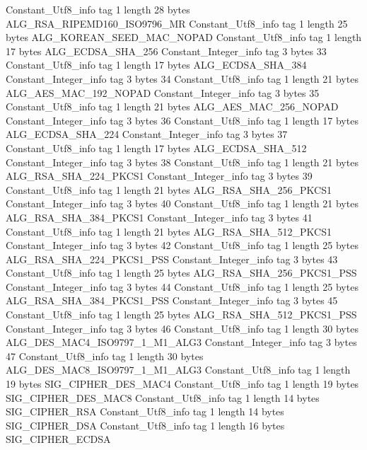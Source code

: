 {{{		}
		Constant_Utf8_info {
			tag	1
			length	28
			bytes	ALG_RSA_RIPEMD160_ISO9796_MR
		}
		Constant_Utf8_info {
			tag	1
			length	25
			bytes	ALG_KOREAN_SEED_MAC_NOPAD
		}
		Constant_Utf8_info {
			tag	1
			length	17
			bytes	ALG_ECDSA_SHA_256
		}
		Constant_Integer_info {
			tag	3
			bytes	33
		}
		Constant_Utf8_info {
			tag	1
			length	17
			bytes	ALG_ECDSA_SHA_384
		}
		Constant_Integer_info {
			tag	3
			bytes	34
		}
		Constant_Utf8_info {
			tag	1
			length	21
			bytes	ALG_AES_MAC_192_NOPAD
		}
		Constant_Integer_info {
			tag	3
			bytes	35
		}
		Constant_Utf8_info {
			tag	1
			length	21
			bytes	ALG_AES_MAC_256_NOPAD
		}
		Constant_Integer_info {
			tag	3
			bytes	36
		}
		Constant_Utf8_info {
			tag	1
			length	17
			bytes	ALG_ECDSA_SHA_224
		}
		Constant_Integer_info {
			tag	3
			bytes	37
		}
		Constant_Utf8_info {
			tag	1
			length	17
			bytes	ALG_ECDSA_SHA_512
		}
		Constant_Integer_info {
			tag	3
			bytes	38
		}
		Constant_Utf8_info {
			tag	1
			length	21
			bytes	ALG_RSA_SHA_224_PKCS1
		}
		Constant_Integer_info {
			tag	3
			bytes	39
		}
		Constant_Utf8_info {
			tag	1
			length	21
			bytes	ALG_RSA_SHA_256_PKCS1
		}
		Constant_Integer_info {
			tag	3
			bytes	40
		}
		Constant_Utf8_info {
			tag	1
			length	21
			bytes	ALG_RSA_SHA_384_PKCS1
		}
		Constant_Integer_info {
			tag	3
			bytes	41
		}
		Constant_Utf8_info {
			tag	1
			length	21
			bytes	ALG_RSA_SHA_512_PKCS1
		}
		Constant_Integer_info {
			tag	3
			bytes	42
		}
		Constant_Utf8_info {
			tag	1
			length	25
			bytes	ALG_RSA_SHA_224_PKCS1_PSS
		}
		Constant_Integer_info {
			tag	3
			bytes	43
		}
		Constant_Utf8_info {
			tag	1
			length	25
			bytes	ALG_RSA_SHA_256_PKCS1_PSS
		}
		Constant_Integer_info {
			tag	3
			bytes	44
		}
		Constant_Utf8_info {
			tag	1
			length	25
			bytes	ALG_RSA_SHA_384_PKCS1_PSS
		}
		Constant_Integer_info {
			tag	3
			bytes	45
		}
		Constant_Utf8_info {
			tag	1
			length	25
			bytes	ALG_RSA_SHA_512_PKCS1_PSS
		}
		Constant_Integer_info {
			tag	3
			bytes	46
		}
		Constant_Utf8_info {
			tag	1
			length	30
			bytes	ALG_DES_MAC4_ISO9797_1_M1_ALG3
		}
		Constant_Integer_info {
			tag	3
			bytes	47
		}
		Constant_Utf8_info {
			tag	1
			length	30
			bytes	ALG_DES_MAC8_ISO9797_1_M1_ALG3
		}
		Constant_Utf8_info {
			tag	1
			length	19
			bytes	SIG_CIPHER_DES_MAC4
		}
		Constant_Utf8_info {
			tag	1
			length	19
			bytes	SIG_CIPHER_DES_MAC8
		}
		Constant_Utf8_info {
			tag	1
			length	14
			bytes	SIG_CIPHER_RSA
		}
		Constant_Utf8_info {
			tag	1
			length	14
			bytes	SIG_CIPHER_DSA
		}
		Constant_Utf8_info {
			tag	1
			length	16
			bytes	SIG_CIPHER_ECDSA
}}}
